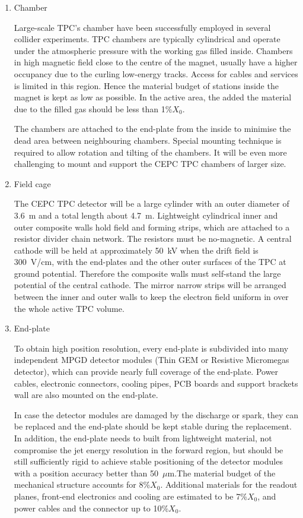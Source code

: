 \begin{enumerate}

\item Chamber

Large-scale TPC's chamber have been successfully employed in several collider experiments. TPC chambers are typically cylindrical and operate under the atmospheric pressure with the working gas filled inside. Chambers in high magnetic field close to the centre of the magnet, usually have a higher occupancy due to the curling low-energy tracks. Access for cables and services is limited in this region. Hence the material budget of stations inside the magnet is kept as low as possible. In the active area, the added the material due to the filled gas should be less than 1\%$X_0$.

The chambers are attached to the end-plate from the inside to minimise the dead area between neighbouring chambers. Special mounting technique is required to allow rotation and tilting of the chambers. It will be even more challenging to mount and support the CEPC TPC chambers of larger size.



\item  Field cage

The CEPC TPC detector will be a large cylinder with an outer diameter of 3.6~m and a total length about 4.7~m. Lightweight cylindrical inner and outer composite walls hold field and forming strips, which are attached to a resistor divider chain network. The resistors must be no-magnetic. A central cathode will be held at approximately 50~kV when the drift field is 300~V/cm, with the end-plates and the other outer surfaces of the TPC at ground potential. Therefore the composite walls must self-stand the large potential of the central cathode. The mirror narrow strips will be arranged between the inner and outer walls to keep the electron field uniform in over the whole active TPC volume.



\item  End-plate

To obtain high position resolution, every end-plate is subdivided into many independent MPGD detector modules (Thin GEM or Resistive Micromegas detector), which can provide nearly full coverage of the end-plate. Power cables, electronic connectors, cooling pipes, PCB boards and support brackets wall are also mounted on the end-plate.

In case the detector modules are damaged by the discharge or spark, they can be replaced and the end-plate should be kept stable during the replacement. In addition, the end-plate needs to built from lightweight material, not compromise the jet energy resolution in the forward region, but should be still sufficiently rigid to achieve stable positioning of the detector modules with a position accuracy better than 50~$\mu$m.The material budget of the mechanical structure accounts for 8\%$X_0$. Additional materials for the readout planes, front-end electronics and cooling are estimated to be 7\%$X_0$, and power cables and the connector up to 10\%$X_0$.
\end{enumerate}

